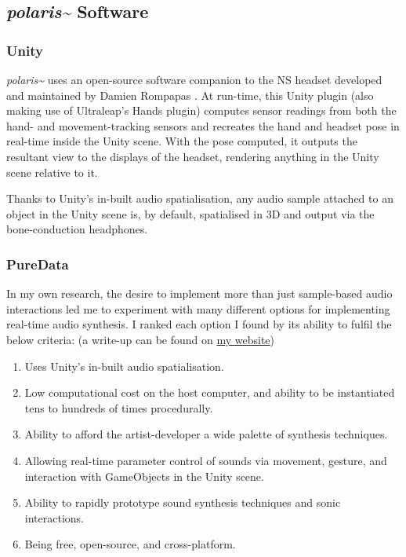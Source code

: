 \subsection{\textit{polaris\textasciitilde{}} Software}\label{sec: polaris-framework-software}
\subsubsection{Unity}\label{sec: polaris-framework-software-unity}
\textit{polaris\textasciitilde{}} uses an open-source software companion to the NS headset developed and maintained by Damien Rompapas \citeyearpar{rompapas2020}. At run-time, this Unity plugin (also making use of Ultraleap's Hands plugin) computes sensor readings from both the hand- and movement-tracking sensors and recreates the hand and headset pose in real-time inside the Unity scene. With the pose computed, it outputs the resultant view to the displays of the headset, rendering anything in the Unity scene relative to it.

Thanks to Unity's in-built audio spatialisation, any audio sample attached to an object in the Unity scene is, by default, spatialised in 3D and output via the bone-conduction headphones.

\subsubsection{PureData}\label{sec: polaris-framework-software-puredata}
In my own research, the desire to implement more than just sample-based audio interactions led me to experiment with many different options for implementing real-time audio synthesis. I ranked each option I found by its ability to fulfil the below criteria: (a write-up can be found on \href{https://sambilbow.github.io/projects/polaris/software.html}{my website})

\begin{enumerate}
    \item Uses Unity's in-built audio spatialisation.
    \item Low computational cost on the host computer, and ability to be instantiated tens to hundreds of times procedurally.
    \item Ability to afford the artist-developer a wide palette of synthesis techniques.
    \item Allowing real-time parameter control of sounds via movement, gesture, and interaction with GameObjects in the Unity scene.
    \item Ability to rapidly prototype sound synthesis techniques and sonic interactions.
    \item Being free, open-source, and cross-platform.
\end{enumerate}

